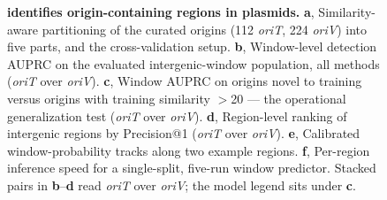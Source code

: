 \begin{figure}[h]
    \centering
\caption{
\textbf{\model identifies origin-containing regions in plasmids.} \textbf{a}, Similarity-aware partitioning of the curated origins (112 \emph{oriT}, 224 \emph{oriV}) into five parts, and the cross-validation setup. \textbf{b}, Window-level detection AUPRC on the evaluated intergenic-window population, all methods (\emph{oriT} over \emph{oriV}). \textbf{c}, Window AUPRC on origins novel to training versus origins with training similarity $>$20 --- the operational generalization test (\emph{oriT} over \emph{oriV}). \textbf{d}, Region-level ranking of intergenic regions by Precision@1 (\emph{oriT} over \emph{oriV}). \textbf{e}, Calibrated window-probability tracks along two example regions. \textbf{f}, Per-region inference speed for a single-split, five-run window predictor. Stacked pairs in \textbf{b}--\textbf{d} read \emph{oriT} over \emph{oriV}; the model legend sits under \textbf{c}.
}
\label{fig:origin}
\end{figure}


\begin{figure}[h]
    \centering
\caption{
}
\label{fig:genomewide}
\end{figure}


